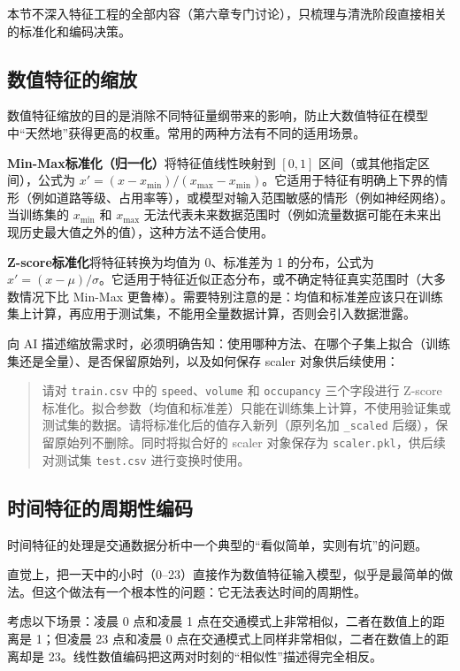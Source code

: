 本节不深入特征工程的全部内容（第六章专门讨论），只梳理与清洗阶段直接相关的标准化和编码决策。

\subsection{数值特征的缩放}

数值特征缩放的目的是消除不同特征量纲带来的影响，防止大数值特征在模型中“天然地”获得更高的权重。常用的两种方法有不同的适用场景。

\textbf{Min-Max标准化（归一化）}将特征值线性映射到 $[0, 1]$ 区间（或其他指定区间），公式为 $x' = (x - x_{\min}) / (x_{\max} - x_{\min})$。它适用于特征有明确上下界的情形（例如道路等级、占用率等），或模型对输入范围敏感的情形（例如神经网络）。当训练集的 $x_{\min}$ 和 $x_{\max}$ 无法代表未来数据范围时（例如流量数据可能在未来出现历史最大值之外的值），这种方法不适合使用。

\textbf{Z-score标准化}将特征转换为均值为 0、标准差为 1 的分布，公式为 $x' = (x - \mu) / \sigma$。它适用于特征近似正态分布，或不确定特征真实范围时（大多数情况下比 Min-Max 更鲁棒）。需要特别注意的是：均值和标准差应该只在训练集上计算，再应用于测试集，不能用全量数据计算，否则会引入数据泄露。

向 AI 描述缩放需求时，必须明确告知：使用哪种方法、在哪个子集上拟合（训练集还是全量）、是否保留原始列，以及如何保存 scaler 对象供后续使用：

\begin{quote}
请对 \texttt{train.csv} 中的 \texttt{speed}、\texttt{volume} 和 \texttt{occupancy} 三个字段进行 Z-score 标准化。拟合参数（均值和标准差）只能在训练集上计算，不使用验证集或测试集的数据。请将标准化后的值存入新列（原列名加 \texttt{\_scaled} 后缀），保留原始列不删除。同时将拟合好的 scaler 对象保存为 \texttt{scaler.pkl}，供后续对测试集 \texttt{test.csv} 进行变换时使用。
\end{quote}

\subsection{时间特征的周期性编码}

时间特征的处理是交通数据分析中一个典型的“看似简单，实则有坑”的问题。

直觉上，把一天中的小时（0--23）直接作为数值特征输入模型，似乎是最简单的做法。但这个做法有一个根本性的问题：它无法表达时间的周期性。

考虑以下场景：凌晨 0 点和凌晨 1 点在交通模式上非常相似，二者在数值上的距离是 1；但凌晨 23 点和凌晨 0 点在交通模式上同样非常相似，二者在数值上的距离却是 23。线性数值编码把这两对时刻的“相似性”描述得完全相反。

